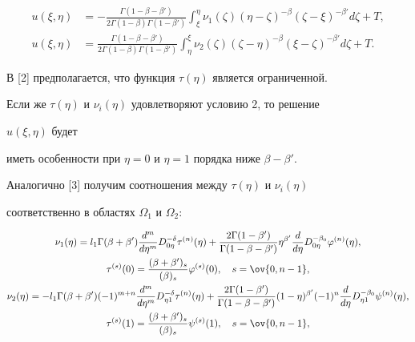 \begin{align} 


u(\xi,\eta)&=-\frac{\Gamma(1-\beta-\beta')} 


{2\Gamma(1-\beta)\Gamma(1-\beta')}\int^\eta_\xi 


\nu_1(\zeta)(\eta-\zeta)^{-\beta} 


(\zeta-\xi)^{-\beta'}d\zeta+T, \\ 


% 


u(\xi,\eta)&=\frac{\Gamma(1-\beta-\beta')} 


{2\Gamma(1-\beta)\Gamma(1-\beta')}\int^\xi_\eta 


\nu_2(\zeta)(\zeta-\eta)^{-\beta} 


(\xi-\zeta)^{-\beta'}d\zeta+T. 


\end{align} 


 


В [2] предполагается, что функция $\tau(\eta)$ является ограниченной. 


Если же $\tau(\eta)$ и $\nu_i(\eta)$ удовлетворяют условию 2, то решение 


$u(\xi,\eta)$ будет 


иметь особенности при $\eta=0$ и $\eta=1$ порядка ниже $\beta-\beta'$. 


 


Аналогично [3] получим соотношения между $\tau(\eta)$ и $\nu_i(\eta)$ 


соответственно в областях $\Omega_1$ и $\Omega_2$: 


\begin{gather} 


\nu_1(\eta)=l_1\Gamma(\beta+\beta') 


\frac{d^m}{d\eta^m}D^{-\delta}_{0\eta}\tau^{(n)}(\eta)+ 


\frac{2\Gamma(1-\beta')}{\Gamma(1-\beta-\beta')}\eta^{\beta'} 


\frac{d}{d\eta}D^{-\beta_0}_{0\eta} \varphi^{(n)}(\eta), \\ 


% 


\tau^{(s)}(0)=\frac{(\beta+\beta')_s}{(\beta)_s}\varphi^{(s)}(0),\quad 


s=\ov{0,n-1}, \\ 


% 


\nu_2(\eta)=-l_1\Gamma(\beta+\beta')(-1)^{m+n} 


\frac{d^m}{d\eta^m}D^{-\delta}_{\eta1}\tau^{(n)}(\eta)+ 


\frac{2\Gamma(1-\beta')}{\Gamma(1-\beta-\beta')} 


(1-\eta)^{\beta'}(-1)^n\frac{d}{d\eta} 


D^{-\beta_0}_{\eta1}\psi^{(n)}(\eta), \\ 


% 


\tau^{(s)}(1)=\frac{(\beta+\beta')_s}{(\beta)_s} 


\psi^{(s)}(1),\quad s=\ov{0,n-1}, 


\end{gather} 


